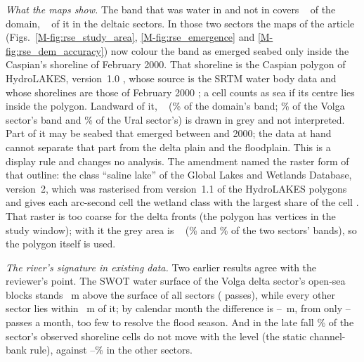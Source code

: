 \emph{What the maps show.} The band that was water in  and not in  covers ~\kmsq{} of the domain, ~\kmsq{} of it in the deltaic sectors. In those two sectors the maps of the article (Figs.~\ref{M-fig:rse_study_area}, \ref{M-fig:rse_emergence} and \ref{M-fig:rse_dem_accuracy}) now colour the band as emerged seabed only inside the Caspian's shoreline of February 2000. That shoreline is the Caspian polygon of HydroLAKES, version~1.0 \citep{messager2016}, whose source is the SRTM water body data and whose shorelines are those of February 2000 \citep{hydrolakes_doc}; a cell counts as sea if its centre lies inside the polygon. Landward of it, ~\kmsq{} (\% of the domain's band; \% of the Volga sector's band and \% of the Ural sector's) is drawn in grey and not interpreted. Part of it may be seabed that emerged between  and 2000; the data at hand cannot separate that part from the delta plain and the floodplain. This is a display rule and changes no analysis. The amendment named the raster form of that outline: the class ``saline lake'' of the Global Lakes and Wetlands Database, version~2, which was rasterised from version~1.1 of the HydroLAKES polygons and gives each  arc-second cell the wetland class with the largest share of the cell \citep{lehner2025}. That raster is too coarse for the delta fronts (the polygon has  vertices in the study window); with it the grey area is ~\kmsq{} (\% and \% of the two sectors' bands), so the polygon itself is used.

\emph{The river's signature in existing data.} Two earlier results agree with the reviewer's point. The SWOT water surface of the Volga delta sector's open-sea blocks stands ~m above the surface of all sectors ( passes), while every other sector lies within ~m of it; by calendar month the difference is --~m, from only -- passes a month, too few to resolve the flood season. And in the late fall \% of the sector's observed shoreline cells do not move with the level (the static channel-bank rule), against --\% in the other sectors.


